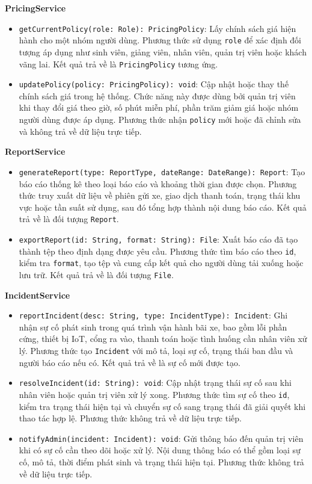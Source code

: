 \noindent\textbf{PricingService}
\begin{itemize}
    \item \texttt{getCurrentPolicy(role: Role): PricingPolicy}: Lấy chính sách giá hiện hành cho một nhóm người dùng. Phương thức sử dụng \texttt{role} để xác định đối tượng áp dụng như sinh viên, giảng viên, nhân viên, quản trị viên hoặc khách vãng lai. Kết quả trả về là \texttt{PricingPolicy} tương ứng.
    \item \texttt{updatePolicy(policy: PricingPolicy): void}: Cập nhật hoặc thay thế chính sách giá trong hệ thống. Chức năng này được dùng bởi quản trị viên khi thay đổi giá theo giờ, số phút miễn phí, phần trăm giảm giá hoặc nhóm người dùng được áp dụng. Phương thức nhận \texttt{policy} mới hoặc đã chỉnh sửa và không trả về dữ liệu trực tiếp.
\end{itemize}

\noindent\textbf{ReportService}
\begin{itemize}
    \item \texttt{generateReport(type: ReportType, dateRange: DateRange): Report}: Tạo báo cáo thống kê theo loại báo cáo và khoảng thời gian được chọn. Phương thức truy xuất dữ liệu về phiên gửi xe, giao dịch thanh toán, trạng thái khu vực hoặc tần suất sử dụng, sau đó tổng hợp thành nội dung báo cáo. Kết quả trả về là đối tượng \texttt{Report}.
    \item \texttt{exportReport(id: String, format: String): File}: Xuất báo cáo đã tạo thành tệp theo định dạng được yêu cầu. Phương thức tìm báo cáo theo \texttt{id}, kiểm tra \texttt{format}, tạo tệp và cung cấp kết quả cho người dùng tải xuống hoặc lưu trữ. Kết quả trả về là đối tượng \texttt{File}.
\end{itemize}

\noindent\textbf{IncidentService}
\begin{itemize}
    \item \texttt{reportIncident(desc: String, type: IncidentType): Incident}: Ghi nhận sự cố phát sinh trong quá trình vận hành bãi xe, bao gồm lỗi phần cứng, thiết bị IoT, cổng ra vào, thanh toán hoặc tình huống cần nhân viên xử lý. Phương thức tạo \texttt{Incident} với mô tả, loại sự cố, trạng thái ban đầu và người báo cáo nếu có. Kết quả trả về là sự cố mới được tạo.
    \item \texttt{resolveIncident(id: String): void}: Cập nhật trạng thái sự cố sau khi nhân viên hoặc quản trị viên xử lý xong. Phương thức tìm sự cố theo \texttt{id}, kiểm tra trạng thái hiện tại và chuyển sự cố sang trạng thái đã giải quyết khi thao tác hợp lệ. Phương thức không trả về dữ liệu trực tiếp.
    \item \texttt{notifyAdmin(incident: Incident): void}: Gửi thông báo đến quản trị viên khi có sự cố cần theo dõi hoặc xử lý. Nội dung thông báo có thể gồm loại sự cố, mô tả, thời điểm phát sinh và trạng thái hiện tại. Phương thức không trả về dữ liệu trực tiếp.
\end{itemize}

